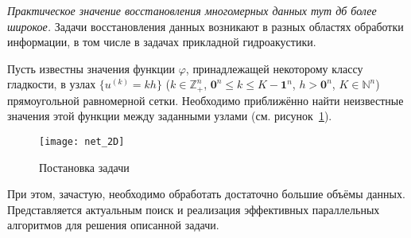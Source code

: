 

\label{sec:func_recv_intro}

\emph{Практическое значение восстановления многомерных данных тут дб более широкое.}
Задачи восстановления данных возникают в разных областях обработки информации,
в том числе в задачах прикладной гидроакустики. 




Пусть известны значения  функции $\varphi$, принадлежащей некоторому классу гладкости, 
в  узлах $\{u^{(k)}=kh\}$ ($k\in \mathbb{Z}_+^n$, $\mathbf{0}^n \le k \le K-\mathbf{1}^n$, $h>\mathbf{0}^n$, $K\in \mathbb{N}^n$) прямоугольной
равномерной сетки. 
Необходимо приближённо найти неизвестные значения
этой функции между заданными узлами (см. рисунок~\ref{fig:net_common}).
\begin{figure}[h!]
  \centering
  \texttt{[image: net\_2D]}
  \caption{Постановка задачи}
  \label{fig:net_common}
\end{figure}
При этом, зачастую, необходимо обработать достаточно большие объёмы данных.
Представляется актуальным поиск и реализация эффективных параллельных алгоритмов
для решения описанной задачи.


